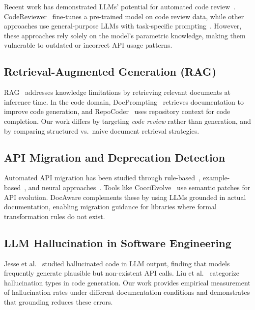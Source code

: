 \documentclass[sigconf,nonacm]{acmart}
\begin{document}
Recent work has demonstrated LLMs' potential for automated code review~\cite{li2022codereviewer,tufano2024code}. CodeReviewer~\cite{li2022codereviewer} fine-tunes a pre-trained model on code review data, while other approaches use general-purpose LLMs with task-specific prompting~\cite{guo2024deepseekcoder}. However, these approaches rely solely on the model's parametric knowledge, making them vulnerable to outdated or incorrect API usage patterns.

\subsection{Retrieval-Augmented Generation (RAG)}

RAG~\cite{lewis2020rag} addresses knowledge limitations by retrieving relevant documents at inference time. In the code domain, DocPrompting~\cite{zhou2022docprompting} retrieves documentation to improve code generation, and RepoCoder~\cite{zhang2023repocoder} uses repository context for code completion. Our work differs by targeting \emph{code review} rather than generation, and by comparing structured vs.\ naive document retrieval strategies.

\subsection{API Migration and Deprecation Detection}

Automated API migration has been studied through rule-based~\cite{dig2006refactoring}, example-based~\cite{nguyen2010graph}, and neural approaches~\cite{chen2023apimigration}. Tools like CocciEvolve~\cite{lawall2018coccievolve} use semantic patches for API evolution. DocAware complements these by using LLMs grounded in actual documentation, enabling migration guidance for libraries where formal transformation rules do not exist.

\subsection{LLM Hallucination in Software Engineering}

Jesse et al.~\cite{jesse2023hallucination} studied hallucinated code in LLM output, finding that models frequently generate plausible but non-existent API calls. Liu et al.~\cite{liu2024hallucination} categorize hallucination types in code generation. Our work provides empirical measurement of hallucination rates under different documentation conditions and demonstrates that grounding reduces these errors.
\end{document}
